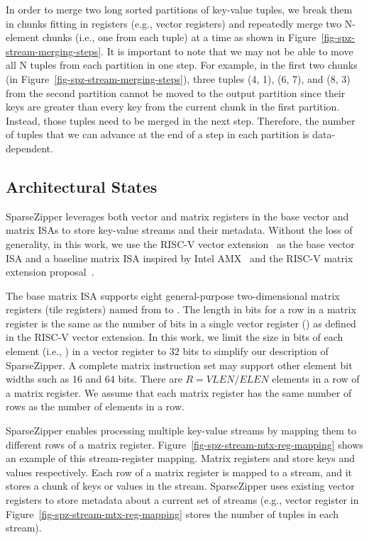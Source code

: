 In order to merge two long sorted partitions of key-value tuples, we break them
in chunks fitting in registers (e.g., vector registers) and repeatedly merge
two N-element chunks (i.e., one from each tuple) at a time as shown in
Figure~\ref{fig-spz-stream-merging-steps}.
It is important to note that we may not be able to move all N tuples from each
partition in one step.
For example, in the first two chunks (in
Figure~\ref{fig-spz-stream-merging-steps}), three tuples (4, 1), (6, 7), and
(8, 3) from the second partition cannot be moved to the output partition since
their keys are greater than every key from the current chunk in the first
partition.
Instead, those tuples need to be merged in the next step.
Therefore, the number of tuples that we can advance at the end of a step in
each partition is data-dependent.

\subsection{Architectural States}
\label{sec-spz-isa-arch-states}


SparseZipper leverages both vector and matrix registers in the base vector and
matrix ISAs to store key-value streams and their metadata.
Without the loss of generality, in this work, we use the RISC-V vector
extension~\cite{riscv-vector-ext} as the base vector ISA and a baseline matrix
ISA inspired by Intel AMX~\cite{intel-amx-web} and the RISC-V matrix extension
proposal~\cite{riscv-mtx-ext-proposal-web}.

The base matrix ISA supports eight general-purpose two-dimensional matrix
registers (tile registers) named from  to .
The length in bits for a row in a matrix register is the same as the number of
bits in a single vector register () as defined in the RISC-V vector
extension.
In this work, we limit the size in bits of each element (i.e., ) in a
vector register to 32 bits to simplify our description of SparseZipper.
A complete matrix instruction set may support other element bit widths such as
16 and 64 bits.
There are $R = VLEN / ELEN$ elements in a row of a matrix register.
We assume that each matrix register has the same number of rows as the number
of elements in a row.

SparseZipper enables processing multiple key-value streams by mapping them to
different rows of a matrix register.
Figure~\ref{fig-spz-stream-mtx-reg-mapping} shows an example of this
stream-register mapping.
Matrix registers  and  store keys and values respectively.
Each row of a matrix register is mapped to a stream, and it stores a chunk of
keys or values in the stream.
SparseZipper uses existing vector registers to store metadata about a current
set of streams (e.g., vector register  in
Figure~\ref{fig-spz-stream-mtx-reg-mapping} stores the number of tuples in each
stream).

